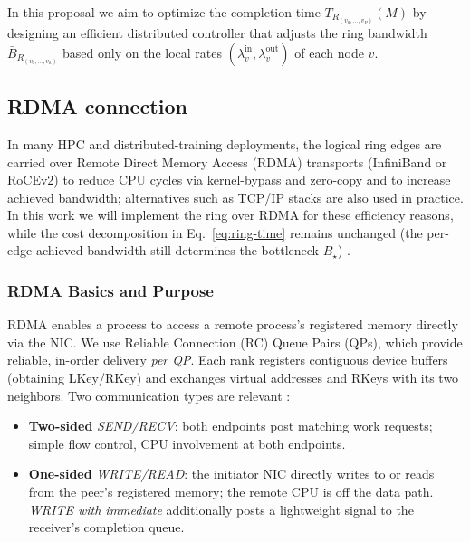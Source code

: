 \documentclass[12pt]{article}
\begin{document}
In this proposal we aim to optimize the completion time $T_{R_(v_0,\dots,v_P)}(M)$ by designing an efficient distributed controller that adjusts the ring bandwidth ${\bar{B}_{R_(v_0,\dots,v_k)}}$ based only on the local rates $(\lambda_v^{\mathrm{in}},\lambda_v^{\mathrm{out}})$ of each node $v$.







\subsection{RDMA connection}
\label{sec:rdma}
In many HPC and distributed-training deployments, the logical ring edges are carried over Remote Direct Memory Access (RDMA) transports (InfiniBand or RoCEv2) to reduce CPU cycles via kernel-bypass and zero-copy and to increase achieved bandwidth; alternatives such as TCP/IP stacks are also used in practice. In this work we will implement the ring over RDMA for these efficiency reasons, while the cost decomposition in Eq.~\eqref{eq:ring-time} remains unchanged (the per-edge achieved bandwidth still determines the bottleneck $B_\star$) \cite{ibta2015vol1,nv-nccl-env}.

\subsubsection{RDMA Basics and Purpose}
RDMA enables a process to access a remote process’s registered memory directly via the NIC. We use Reliable Connection (RC) Queue Pairs (QPs), which provide reliable, in-order delivery \emph{per QP}. Each rank registers contiguous device buffers (obtaining LKey/RKey) and exchanges virtual addresses and RKeys with its two neighbors. Two communication types are relevant \cite{ibta2015vol1}:
\begin{itemize}[leftmargin=*]
  \item \textbf{Two-sided} \textit{SEND/RECV}: both endpoints post matching work requests; simple flow control, CPU involvement at both endpoints.
  \item \textbf{One-sided} \textit{WRITE/READ}: the initiator NIC directly writes to or reads from the peer’s registered memory; the remote CPU is off the data path. \textit{WRITE with immediate} additionally posts a lightweight signal to the receiver’s completion queue.
\end{itemize}
\end{document}
